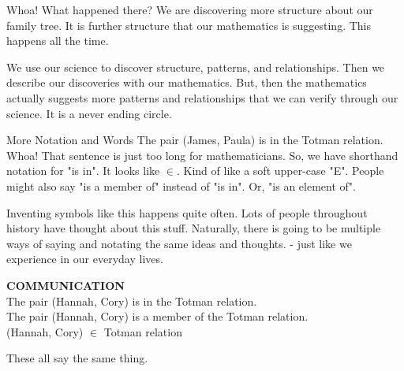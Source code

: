 \documentclass{ximera}
\begin{document}
Whoa!  What happened there?  We are discovering more structure about our family tree.  It is further structure that our mathematics is suggesting.  This happens all the time.  

We use our science to discover structure, patterns, and relationships.  Then we describe our discoveries with our mathematics.  But, then the mathematics actually suggests more patterns and relationships that we can verify through our science. It is a never ending circle.





More Notation and Words 
The pair (James, Paula) is in the Totman relation. 
Whoa! That sentence is just too long for mathematicians. So, we have shorthand notation for "is in".  It looks like $\in$.  Kind of like a soft upper-case "E".  People might also say "is a member of" instead of "is in".  Or, "is an element of".

Inventing symbols like this happens quite often. Lots of people throughout history have thought about this stuff. Naturally, there is going to be multiple ways of saying and notating the same ideas and thoughts. - just like we experience in our everyday lives.
\begin{remark} \textbf{COMMUNICATION} \\
The pair (Hannah, Cory) is in the Totman relation. \\
The pair (Hannah, Cory) is a member of the Totman relation. \\
(Hannah, Cory) $\in$ Totman relation \\

\begin{center}
These all say the same thing.
\end{center}

\end{remark}
\end{document}
